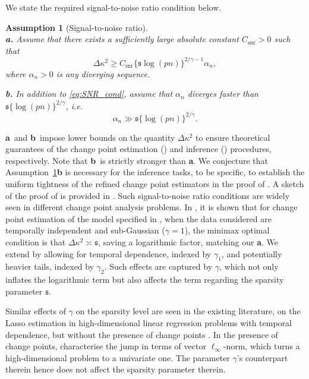 \documentclass[11pt]{article}
\newcommand{\s}{ { \mathfrak{s}  } }
\theoremstyle{plain}
\newtheorem{assumption}{Assumption}
\theoremstyle{definition}
\begin{document}
We state the required signal-to-noise ratio condition below.

\begin{assumption}[Signal-to-noise ratio] \label{assump-snr}
\
\\
\noindent \textbf{a.}
Assume that there exists a sufficiently large absolute constant $C_{\mathrm{snr}} > 0$ such that 
\begin{equation}\label{eq:SNR_cond}
    \Delta \kappa^2 \geq C_{\mathrm{snr}} \big\{\s\log(pn)\big\}^{2/\gamma - 1}\alpha_n,
\end{equation}
where $\alpha_n > 0$ is any diverging sequence.

{\color{black}
\noindent \textbf{b.} 
In addition to \eqref{eq:SNR_cond}, assume that $\alpha_n$ diverges faster than $\s\{\log(pn)\}^{2/\gamma}$, i.e.
\[
    \alpha_n \gg \s\{\log(pn)\}^{2/\gamma}.
\]}
\end{assumption}

\textbf{a}~and \textbf{b}~impose lower bounds on the quantity $\Delta \kappa^2$ to ensure theoretical guarantees of the change point estimation () and inference () procedures, respectively.  Note that \textbf{b}~is strictly stronger than \textbf{a}.  We conjecture that Assumption~\ref{assump-snr}\textbf{b} is necessary for the inference tasks, to be specific, to establish the uniform tightness of the refined change point estimators in the proof of .  A sketch of the proof of  is provided in .  Such signal-to-noise ratio conditions are widely seen in different change point analysis problems. In \cite{rinaldo2021localizing}, it is shown that for change point estimation of the model specified in , when the data considered are temporally independent and sub-Gaussian ($\gamma = 1$), the minimax optimal condition is that $\Delta \kappa^2 \asymp \s$, saving a logarithmic factor, matching our \textbf{a}. We extend \cite{rinaldo2021localizing} by allowing for temporal dependence, indexed by $\gamma_1$, and potentially heavier tails, indexed by $\gamma_2$.  Such effects are captured by $\gamma$, which not only inflates the logarithmic term but also affects the term regarding the sparsity parameter $\s$.


Similar effects of $\gamma$ on the sparsity level are seen in the existing literature, on the Lasso estimation in high-dimensional linear regression problems with temporal dependence, but without the presence of change points \citep[e.g.][]{wu2016performance, wong2020lasso, kuchibhotla2021uniform, han2020high}. In the presence of change points, \cite{chen2021inference} characterise the jump in terms of vector $\ell_{\infty}$-norm, which turns a high-dimensional problem to a univariate one.  The parameter $\gamma$'s counterpart therein hence does not affect the sparsity parameter therein. 
\end{document}
